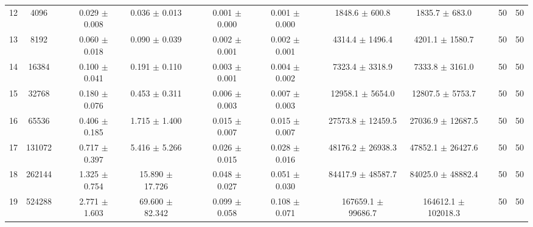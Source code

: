 \documentclass[11pt]{article}
\begin{document}
\begin{table}
\begin{tabular}{cccccccccccccc}
12 &    4096 &&  0.029 $\pm$ 0.008 & 0.036 $\pm$ 0.013 &&  0.001 $\pm$ 0.000 & 0.001 $\pm$ 0.000 &&  1848.6 $\pm$ 600.8 & 1835.7 $\pm$ 683.0 && 50& 50\\
13 &    8192 &&  0.060 $\pm$ 0.018 & 0.090 $\pm$ 0.039 &&  0.002 $\pm$ 0.001 & 0.002 $\pm$ 0.001 &&  4314.4 $\pm$ 1496.4 & 4201.1 $\pm$ 1580.7 && 50& 50\\
14 &   16384 &&  0.100 $\pm$ 0.041 & 0.191 $\pm$ 0.110 &&  0.003 $\pm$ 0.001 & 0.004 $\pm$ 0.002 &&  7323.4 $\pm$ 3318.9 & 7333.8 $\pm$ 3161.0 && 50& 50\\
15 &   32768 &&  0.180 $\pm$ 0.076 & 0.453 $\pm$ 0.311 &&  0.006 $\pm$ 0.003 & 0.007 $\pm$ 0.003 &&  12958.1 $\pm$ 5654.0 & 12807.5 $\pm$ 5753.7 && 50& 50\\
16 &   65536 &&  0.406 $\pm$ 0.185 & 1.715 $\pm$ 1.400 &&  0.015 $\pm$ 0.007 & 0.015 $\pm$ 0.007 &&  27573.8 $\pm$ 12459.5 & 27036.9 $\pm$ 12687.5 && 50& 50\\
17 &  131072 &&  0.717 $\pm$ 0.397 & 5.416 $\pm$ 5.266 &&  0.026 $\pm$ 0.015 & 0.028 $\pm$ 0.016 &&  48176.2 $\pm$ 26938.3 & 47852.1 $\pm$ 26427.6 && 50& 50\\
18 &  262144 &&  1.325 $\pm$ 0.754 & 15.890 $\pm$ 17.726 &&  0.048 $\pm$ 0.027 & 0.051 $\pm$ 0.030 &&  84417.9 $\pm$ 48587.7 & 84025.0 $\pm$ 48882.4 && 50& 50\\
19 &  524288 &&  2.771 $\pm$ 1.603 & 69.600 $\pm$ 82.342 &&  0.099 $\pm$ 0.058 & 0.108 $\pm$ 0.071 &&  167659.1 $\pm$ 99686.7 & 164612.1 $\pm$ 102018.3 && 50& 50\\
\end{tabular}
\end{table}
\end{document}
